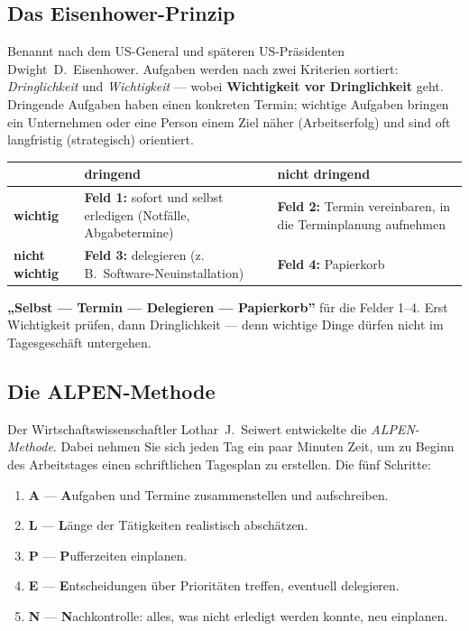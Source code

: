 \documentclass[11pt, a4paper]{article}
\begin{document}
\subsection{Das Eisenhower-Prinzip}

Benannt nach dem US-General und späteren US-Präsidenten Dwight~D.\ Eisenhower. Aufgaben
werden nach zwei Kriterien sortiert: \emph{Dringlichkeit} und \emph{Wichtigkeit} ---
wobei \textbf{Wichtigkeit vor Dringlichkeit} geht. Dringende Aufgaben haben einen
konkreten Termin; wichtige Aufgaben bringen ein Unternehmen oder eine Person einem Ziel
näher (Arbeitserfolg) und sind oft langfristig (strategisch) orientiert.

\begin{center}
\begin{tabular}{p{2.6cm} p{4.7cm} p{4.7cm}}
\toprule
 & \textbf{dringend} & \textbf{nicht dringend}\\
\midrule
\textbf{wichtig} & \textbf{Feld 1:} sofort und selbst erledigen (Notfälle, Abgabetermine) & \textbf{Feld 2:} Termin vereinbaren, in die Terminplanung aufnehmen\\
\textbf{nicht wichtig} & \textbf{Feld 3:} delegieren (z.\,B.\ Software-Neuinstallation) & \textbf{Feld 4:} Papierkorb\\
\bottomrule
\end{tabular}
\end{center}

\begin{eselsbruecke}
\textbf{„Selbst --- Termin --- Delegieren --- Papierkorb”} für die Felder 1--4. Erst
Wichtigkeit prüfen, dann Dringlichkeit --- denn wichtige Dinge dürfen nicht im
Tagesgeschäft untergehen.
\end{eselsbruecke}

\subsection{Die ALPEN-Methode}

Der Wirtschaftswissenschaftler Lothar~J.\ Seiwert entwickelte die \emph{ALPEN-Methode}.
Dabei nehmen Sie sich jeden Tag ein paar Minuten Zeit, um zu Beginn des Arbeitstages
einen schriftlichen Tagesplan zu erstellen. Die fünf Schritte:

\begin{enumerate}
  \item \textbf{A} --- \textbf{A}ufgaben und Termine zusammenstellen und aufschreiben.
  \item \textbf{L} --- \textbf{L}änge der Tätigkeiten realistisch abschätzen.
  \item \textbf{P} --- \textbf{P}ufferzeiten einplanen.
  \item \textbf{E} --- \textbf{E}ntscheidungen über Prioritäten treffen, eventuell delegieren.
  \item \textbf{N} --- \textbf{N}achkontrolle: alles, was nicht erledigt werden konnte, neu einplanen.
\end{enumerate}
\end{document}
